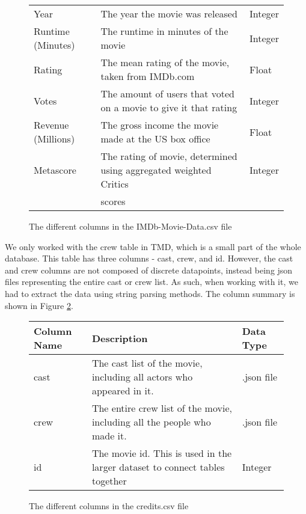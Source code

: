 \begin{figure}[h]
\begin{tabular}[width=\linewidth]{lll}
                Year  &                 The year the movie was released                                             & Integer \\
                Runtime (Minutes) &     The runtime in minutes of the movie                                         & Integer \\ 
                Rating   &              The mean rating of the movie, taken from IMDb.com                           & Float \\
                Votes   &               The amount of users that voted on a movie to give it that rating            & Integer \\ 
                Revenue (Millions) &    The gross income the movie made at the US box office                        & Float \\  
                Metascore   &           The rating of movie, determined using aggregated weighted Critics           & Integer \\
                {}          &           scores                                                                      & {} \\         
                \bottomrule
            \end{tabular}
            \caption[short]{The different columns in the IMDb-Movie-Data.csv file}\label{fig-IMDb-Movie-Data-Column-Description}
        \end{figure}

        We only worked with the crew table in TMD, which is a small part of the whole database.
        This table has three columns - cast, crew, and id.
        However, the cast and crew columns are not composed of discrete datapoints, instead being json files representing the entire cast or crew list.
        As such, when working with it, we had to extract the data using string parsing methods.
        The column summary is shown in Figure \ref*{fig-Credits-Column-Description}.
        \begin{figure}[h]
            \centering
            \begin{tabular}[width = \textwidth]{lll}
                \toprule
                Column Name &           Description                                                                 & Data Type  \\
                \midrule
                cast &                  The cast list of the movie, including all actors who appeared in it.        & .json file \\          
                crew &                  The entire crew list of the movie, including all the people who made it.    & .json file \\
                id &                    The movie id. This is used in the larger dataset to connect tables together & Integer     \\        
                \bottomrule
            \end{tabular}
            \caption[short]{The different columns in the credits.csv file}\label{fig-Credits-Column-Description}
        \end{figure}

